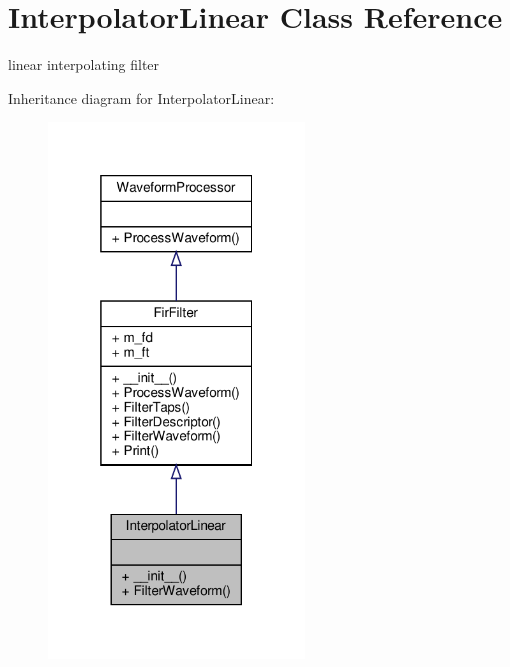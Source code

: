 \hypertarget{classSignalIntegrity_1_1TimeDomain_1_1Filters_1_1InterpolatorLinear_1_1InterpolatorLinear}{}\section{Interpolator\+Linear Class Reference}
\label{classSignalIntegrity_1_1TimeDomain_1_1Filters_1_1InterpolatorLinear_1_1InterpolatorLinear}


linear interpolating filter  




Inheritance diagram for Interpolator\+Linear\+:
\nopagebreak
\begin{figure}[H]
\begin{center}
\leavevmode
\includegraphics[width=193pt]{classSignalIntegrity_1_1TimeDomain_1_1Filters_1_1InterpolatorLinear_1_1InterpolatorLinear__inherit__graph}
\end{center}
\end{figure}


